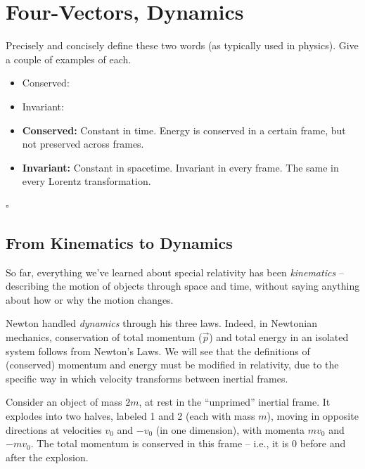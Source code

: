 \documentclass[11pt, letterpaper, openany]{book}
\newenvironment{exercise}[1][Exercise]{%
  \tcolorbox[blanker, breakable, left=1em,
    before skip=1em, after skip=1em,
    borderline west={3pt}{0pt}{PhysNavy},
    colback=PhysCream,
    before upper={\textcolor{PhysNavy}{\sffamily\bfseries #1:}\space}
  ]%
}{%
  \endtcolorbox%
}
\newenvironment{solution}[1][Solution]{%
  \tcolorbox[blanker, breakable, left=1em,
    before skip=1em, after skip=1em,
    borderline west={2pt}{0pt}{PhysTeal},
    colback=PhysCream,
    before upper={\textcolor{PhysTeal}{\sffamily\bfseries #1.}\space}
  ]%
}{%
  \hfill\textcolor{PhysTeal}{\ensuremath{\square}}\endtcolorbox%
}
\begin{document}
\chapter{Four-Vectors, Dynamics}

\begin{exercise}[Exercise 1]
Precisely and concisely define these two words (as typically used in physics). Give a couple of examples of each.
\begin{itemize}
    \item Conserved:
    \item Invariant:
\end{itemize}
\end{exercise}
\begin{solution}
\begin{itemize}
    \item \textbf{Conserved:} Constant in time. Energy is conserved in a certain frame, but not preserved across frames.
    \item \textbf{Invariant:} Constant in spacetime. Invariant in every frame. The same in every Lorentz transformation.
\end{itemize}
\end{solution}

\section{From Kinematics to Dynamics}

So far, everything we've learned about special relativity has been \textit{kinematics} -- describing the motion of objects through space and time, without saying anything about how or why the motion changes.

Newton handled \textit{dynamics} through his three laws. Indeed, in Newtonian mechanics, conservation of total momentum ($\vec{p}$) and total energy in an isolated system follows from Newton's Laws. We will see that the definitions of (conserved) momentum and energy must be modified in relativity, due to the specific way in which velocity transforms between inertial frames.

Consider an object of mass $2m$, at rest in the ``unprimed'' inertial frame. It explodes into two halves, labeled 1 and 2 (each with mass $m$), moving in opposite directions at velocities $v_0$ and $-v_0$ (in one dimension), with momenta $mv_0$ and $-mv_0$. The total momentum is conserved in this frame -- i.e., it is 0 before and after the explosion.
\end{document}
